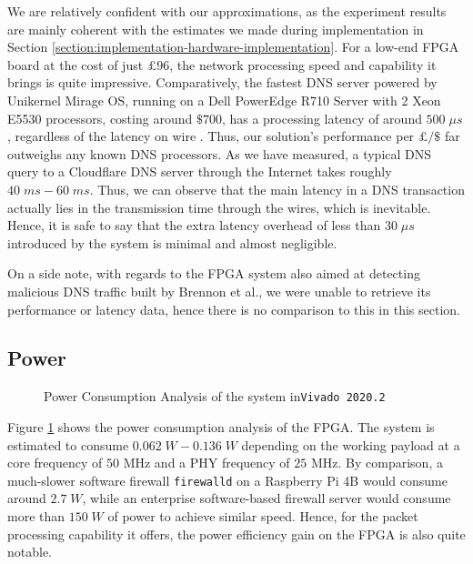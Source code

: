 \documentclass[a4paper]{report}
\newcommand{\code}{\texttt}
\begin{document}
We are relatively confident with our approximations, as the experiment results are mainly coherent with the estimates we made during implementation in Section \ref{section:implementation-hardware-implementation}. For a low-end FPGA board at the cost of just $£96$, the network processing speed and capability it brings is quite impressive. Comparatively, the fastest DNS server powered by Unikernel Mirage OS, running on a Dell PowerEdge R710 Server with 2 Xeon E5530 processors, costing around $\$700$, has a processing latency of around $500\; \mu s$, regardless of the latency on wire \cite{briggs-2014, madhavapeddy-2013}. Thus, our solution's performance per $£/\$$ far outweighs any known DNS processors. As we have measured, a typical DNS query to a Cloudflare DNS server through the Internet takes roughly $40\;ms - 60\;ms$. Thus, we can observe that the main latency in a DNS transaction actually lies in the transmission time through the wires, which is inevitable. Hence, it is safe to say that the extra latency overhead of less than $30\; \mu s$ introduced by the system is minimal and almost negligible.

On a side note, with regards to the FPGA system also aimed at detecting malicious DNS traffic built by Brennon et al.\cite{thomas-2011}, we were unable to retrieve its performance or latency data, hence there is no comparison to this in this section.

\subsection{Power}

\begin{figure}[h!]
  \caption{Power Consumption Analysis of the system in\code{Vivado 2020.2}}
  \label{fig:power-consumption-analysis}
\end{figure}

Figure \ref{fig:power-consumption-analysis} shows the power consumption analysis of the FPGA. The system is estimated to consume $0.062\;W - 0.136\;W$ depending on the working payload at a core frequency of $50$ MHz and a PHY frequency of $25$ MHz. By comparison, a much-slower software firewall \code{firewalld} on a Raspberry Pi 4B would consume around $2.7 \; W$, while an enterprise software-based firewall server would consume more than $150 \; W$ of power to achieve similar speed. Hence, for the packet processing capability it offers, the power efficiency gain on the FPGA is also quite notable.
\end{document}
